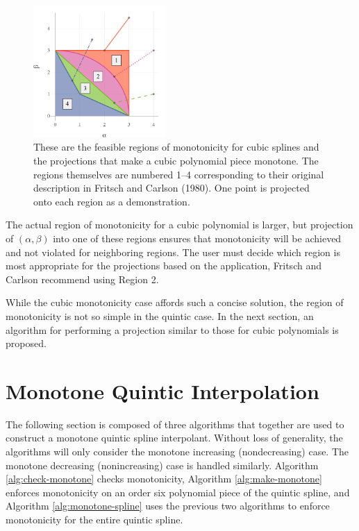 \documentclass{scspaperproc}
\theoremstyle{scsthe}
\begin{document}
\begin{figure}
  \centering
  \includegraphics[width=0.45\textwidth]{cubic_projection_demonstration}
  \caption{These are the feasible regions of monotonicity for cubic splines and the projections that make a cubic polynomial piece monotone. The regions themselves are numbered 1--4 corresponding to their original description in Fritsch and Carlson (1980). One point is projected onto each region as a demonstration.}\label{fig:projection}
\end{figure}

The actual region of monotonicity for a cubic polynomial is larger, but projection of $(\alpha, \beta)$ into one of these regions ensures that monotonicity will be achieved and not violated for neighboring regions. The user must decide which region is most appropriate for the projections based on the application, Fritsch and Carlson recommend using Region 2.

While the cubic monotonicity case affords such a concise solution, the region of monotonicity is not so simple in the quintic case. In the next section, an algorithm for performing a projection similar to those for cubic polynomials is proposed.

\section{Monotone Quintic Interpolation}

The following section is composed of three algorithms that together are used to construct a monotone quintic spline interpolant. Without loss of generality, the algorithms will only consider the monotone increasing (nondecreasing) case. The monotone decreasing (nonincreasing) case is handled similarly. Algorithm \ref{alg:check-monotone} checks monotonicity,
Algorithm \ref{alg:make-monotone} enforces monotonicity on an order six
polynomial piece of the quintic spline, and Algorithm
\ref{alg:monotone-spline} uses the previous two algorithms to enforce
monotonicity for the entire quintic spline.
\end{document}
